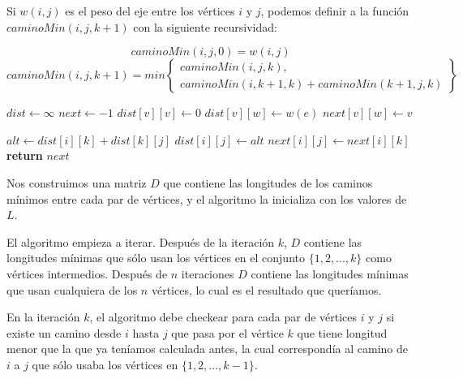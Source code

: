 Si $w(i,j)$ es el peso del eje entre los v\'ertices $i$ y $j$, podemos definir a la funci\'on $caminoMin(i,j,k+1)$ con la siguiente recursividad:

\[
caminoMin(i,j,0) = w(i,j)
\]
\[
caminoMin(i,j,k+1) = min\left\{\begin{array}{lr}
    caminoMin(i,j,k), \\
    caminoMin(i,k+1,k) + caminoMin(k+1, j, k)
    \end{array}\right\}
\]





\begin{algorithm}
\begin{algorithmic}[1]
  \State $dist \gets \infty$
  \State $next \gets -1$
    \State $dist[v][v] \gets 0$
  \EndFor
    \State $dist[v][w] \gets w(e)$
    \State $next[v][w] \gets v$
  \EndFor

        \State $alt \gets dist[i][k] + dist[k][j]$
          \State $dist[i][j] \gets alt$
          \State $next[i][j] \gets next[i][k]$
        \EndIf
      \EndFor
    \EndFor
  \EndFor
  \State \textbf{return} $next$
\EndFunction
\end{algorithmic}
\end{algorithm}

Nos construimos una matriz $D$ que contiene las longitudes de los caminos m\'inimos entre cada par de v\'ertices, y el algoritmo la inicializa con los valores de $L$.

El algoritmo empieza a iterar. Despu\'es de la iteraci\'on $k$, $D$ contiene las longitudes m\'inimas que s\'olo usan los v\'ertices en el conjunto $\{1, 2, ..., k\}$ como v\'ertices intermedios. Despu\'es de $n$ iteraciones $D$ contiene las longitudes m\'inimas que usan cualquiera de los $n$ v\'ertices, lo cual es el resultado que quer\'iamos.

En la iteraci\'on $k$, el algoritmo debe checkear para cada par de v\'ertices $i$ y $j$ si existe un camino desde $i$ hasta $j$ que pasa por el v\'ertice $k$ que tiene longitud menor que la que ya ten\'iamos calculada antes, la cual correspond\'ia al camino de $i$ a $j$ que s\'olo usaba los v\'ertices en $\{1, 2, ..., k-1\}$.


